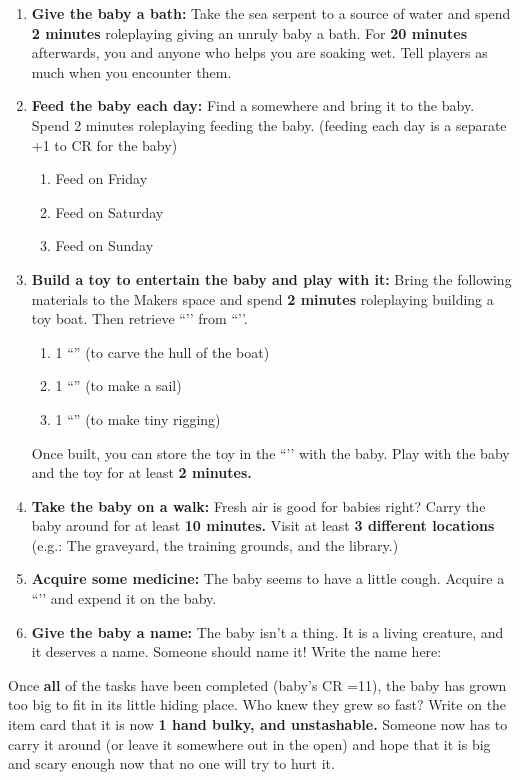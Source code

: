 \documentclass[green]{GL2020}
\begin{document}
\begin{enumerate}
  \item \textbf{Give the baby a bath:} Take the sea serpent to a source of water and spend \textbf{2 minutes} roleplaying giving an unruly baby a bath. For \textbf{20 minutes} afterwards, you and anyone who helps you are soaking wet. Tell players as much when you encounter them.
  \item \textbf{Feed the baby each day:} Find a \iFish{\MYname} somewhere and bring it to the baby. Spend 2 minutes roleplaying feeding the baby. (feeding each day is a separate +1 to CR for the baby)
  \begin{enumerate}
    \item Feed on Friday
    \item Feed on Saturday
    \item Feed on Sunday
  \end{enumerate}
  \item \textbf{Build a toy to entertain the baby and play with it:} Bring the following materials to the Makers space and spend \textbf{2 minutes} roleplaying building a toy boat. Then retrieve ``\iToyBoat{}’’ from ``\sSignH{}’’.
  \begin{enumerate}
    \item 1 ``\iWoodenBlock{}'' (to carve the hull of the boat)
    \item 1 ``\iEagleFeather{}'' (to make a sail)
    \item 1 ``\iThread{}'' (to make tiny rigging)
  \end{enumerate}
  Once built, you can store the toy in the ``\sStudentBookCaseTwo{}’’ with the baby. Play with the baby and the toy for at least \textbf{2 minutes.}
  \item \textbf{Take the baby on a walk:} Fresh air is good for babies right? Carry the baby around for at least \textbf{10 minutes.} Visit at least \textbf{3 different locations} (e.g.: The graveyard, the training grounds, and the library.)
  \item \textbf{Acquire some medicine:} The baby seems to have a little cough. Acquire a ``\iStrength{}’’ and expend it on the baby.
  \item \textbf{Give the baby a name:} The baby isn’t a thing. It is a living creature, and it deserves a name. Someone should name it! Write the name here: \underline{\hspace{2cm}}
\end{enumerate}

Once \textbf{all} of the tasks have been completed (baby’s CR =11), the baby has grown too big to fit in its little hiding place. Who knew they grew so fast? Write on the item card that it is now \textbf{1 hand bulky, and unstashable.} Someone now has to carry it around (or leave it somewhere out in the open) and hope that it is big and scary enough now that no one will try to hurt it.
\end{document}
